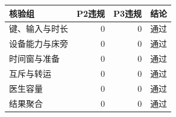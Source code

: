 \begin{tabular}{lrrl}
\toprule
核验组 & P2违规 & P3违规 & 结论 \\
\midrule
键、输入与时长 & 0 & 0 & 通过 \\
设备能力与床旁 & 0 & 0 & 通过 \\
时间窗与准备 & 0 & 0 & 通过 \\
互斥与转运 & 0 & 0 & 通过 \\
医生容量 & 0 & 0 & 通过 \\
结果聚合 & 0 & 0 & 通过 \\
\bottomrule
\end{tabular}
